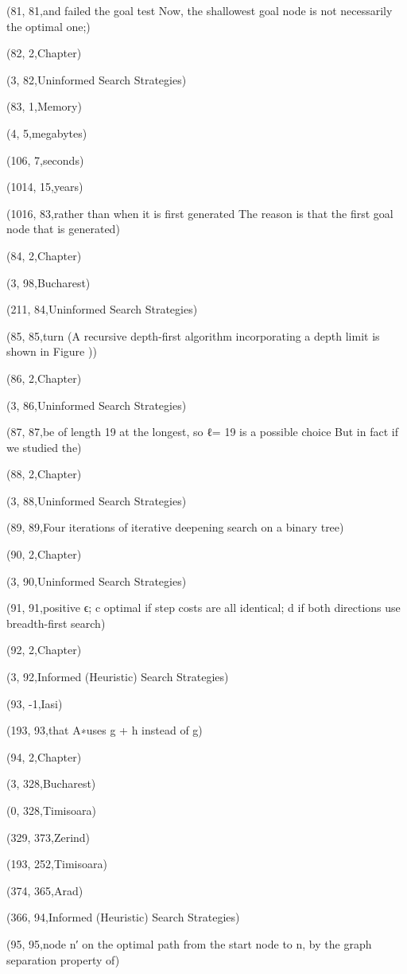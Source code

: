 (81, 81,and failed the goal test Now, the shallowest goal node is not necessarily the optimal one;)

(82, 2,Chapter)

(3, 82,Uninformed Search Strategies)

(83, 1,Memory)

(4, 5,megabytes)

(106, 7,seconds)

(1014, 15,years)

(1016, 83,rather than when it is ﬁrst generated The reason is that the ﬁrst goal node that is generated)

(84, 2,Chapter)

(3, 98,Bucharest)

(211, 84,Uninformed Search Strategies)

(85, 85,turn (A recursive depth-ﬁrst algorithm incorporating a depth limit is shown in Figure ))

(86, 2,Chapter)

(3, 86,Uninformed Search Strategies)

(87, 87,be of length 19 at the longest, so ℓ= 19 is a possible choice But in fact if we studied the)

(88, 2,Chapter)

(3, 88,Uninformed Search Strategies)

(89, 89,Four iterations of iterative deepening search on a binary tree)

(90, 2,Chapter)

(3, 90,Uninformed Search Strategies)

(91, 91,positive ϵ; c optimal if step costs are all identical; d if both directions use breadth-ﬁrst search)

(92, 2,Chapter)

(3, 92,Informed (Heuristic) Search Strategies)

(93, -1,Iasi)

(193, 93,that A∗uses g + h instead of g)

(94, 2,Chapter)

(3, 328,Bucharest)

(0, 328,Timisoara)

(329, 373,Zerind)

(193, 252,Timisoara)

(374, 365,Arad)

(366, 94,Informed (Heuristic) Search Strategies)

(95, 95,node n′ on the optimal path from the start node to n, by the graph separation property of)

